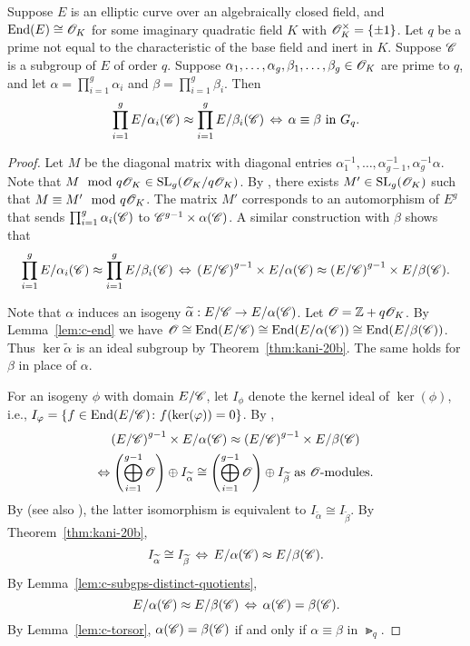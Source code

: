 \documentclass{amsart}
\begin{document}
\begin{lemma}\label{lem:prod-equiv-torsor}
  Suppose $E$ is an elliptic curve over an algebraically closed field, and $\operatorname{End}(E) \cong \mathscr{O}_K$ for some imaginary quadratic field $K$ with $\mathscr{O}_K^\times = \{\pm 1\}$. Let $q$ be a prime not equal to the characteristic of the base field and inert in $K$. Suppose $\mathscr{C}$ is a subgroup of $E$ of order $q$. Suppose $\alpha_1,\dots,\alpha_g,\beta_1,\dots,\beta_g \in \mathscr{O}_K$ are prime to $q$, and let $\alpha = \prod_{i=1}^g\alpha_i$ and $\beta = \prod_{i=1}^g\beta_i$. Then
  \[
    \prod_{i=1}^g E/\alpha_i(\mathscr{C}) \approx \prod_{i=1}^g E/\beta_i(\mathscr{C})
    \,\Leftrightarrow\,
    \alpha \equiv \beta \text{ in } G_q.
  \]
\end{lemma}
\begin{proof}
   Let $M$ be the diagonal matrix with diagonal entries $\alpha_1^{-1},\dots,\alpha_{g-1}^{-1}, \alpha_g^{-1}\alpha$. Note that $M\mod{q\mathscr{O}_K} \in \operatorname{SL}_g(\mathscr{O}_K/q\mathscr{O}_K)$. By \cite[Cor.~5.2]{ktheory1964bass}, there exists $M' \in \operatorname{SL}_g(\mathscr{O}_K)$ such that $M \equiv M' \mod{q\mathscr{O}_K}$. The matrix $M'$ corresponds to an automorphism of $E^g$ that sends $\prod_{i=1}^g \alpha_i(\mathscr{C})$ to $\mathscr{C}^{g-1} \times \alpha(\mathscr{C})$. A similar construction with $\beta$ shows that
  \[
    \prod_{i=1}^g E/\alpha_i(\mathscr{C}) \approx \prod_{i=1}^g E/\beta_i(\mathscr{C})
    \,\Leftrightarrow\,
    \left(E/\mathscr{C}\right)^{g-1} \times E/\alpha(\mathscr{C}) \approx \left(E/\mathscr{C}\right)^{g-1} \times E/\beta(\mathscr{C}).
  \]

  Note that $\alpha$ induces an isogeny $\widetilde{\alpha}: E/\mathscr{C} \to E/\alpha(\mathscr{C})$. Let $\mathscr{O} = \mathbb{Z} + q\mathscr{O}_K$. By Lemma~\ref{lem:c-end} we have $\mathscr{O} \cong \operatorname{End}(E/\mathscr{C})\cong \operatorname{End}(E/\alpha(\mathscr{C}))\cong \operatorname{End}(E/\beta(\mathscr{C}))$. Thus $\ker\tilde{\alpha}$ is an ideal subgroup by Theorem~\ref{thm:kani-20b}. The same holds for $\beta$ in place of $\alpha$.

  For an isogeny $\phi$ with domain $E/\mathscr{C}$, let $I_\phi$ denote the kernel ideal of $\ker(\phi)$, i.e., $I_\varphi = \{f \in \operatorname{End}(E/\mathscr{C}) \colon f(\ker(\varphi)) = 0\}$.
  By \cite[Thm.~46]{kani2011products},
  \begin{multline*}
    \left(E/\mathscr{C}\right)^{g-1} \times E/\alpha(\mathscr{C}) \approx \left(E/\mathscr{C}\right)^{g-1} \times E/\beta(\mathscr{C})
    \\
    \Leftrightarrow
    \left(\bigoplus_{i=1}^{g-1} \mathscr{O}\right) \oplus I_{\widetilde{\alpha}} \cong \left(\bigoplus_{i=1}^{g-1} \mathscr{O}\right) \oplus I_{\widetilde{\beta}} \text{  as $\mathscr{O}$-modules}.
  \end{multline*}
By \cite[Thm.~48]{kani2011products} (see also \cite[Rem.~49b]{kani2011products}), the latter isomorphism is equivalent to $I_{\tilde{\alpha}} \cong I_{\tilde{\beta}}$.
  By Theorem~\ref{thm:kani-20b},
  \[
    I_{\widetilde{\alpha}} \cong I_{\widetilde{\beta}}
    \,\Leftrightarrow\,
    E/\alpha(\mathscr{C}) \approx E/\beta(\mathscr{C}).
  \]
  By Lemma~\ref{lem:c-subgps-distinct-quotients},
  \[
    E/\alpha(\mathscr{C}) \approx E/\beta(\mathscr{C})
    \,\Leftrightarrow\,
    \alpha(\mathscr{C}) = \beta(\mathscr{C}).
  \]
  By Lemma~\ref{lem:c-torsor}, $\alpha(\mathscr{C}) = \beta(\mathscr{C})$ if and only if $\alpha \equiv \beta$ in $\Gt_q$.
\end{proof}
\end{document}
